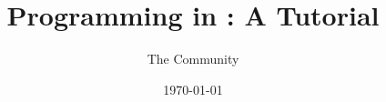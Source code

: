 



\newcommand{\version}{\gitVtagn}

\title{Programming in \Idris{}: A Tutorial}
\author{The \Idris{} Community}
\date{\origdate\today}



\maketitle%
\tableofcontents
\newpage















\newpage




